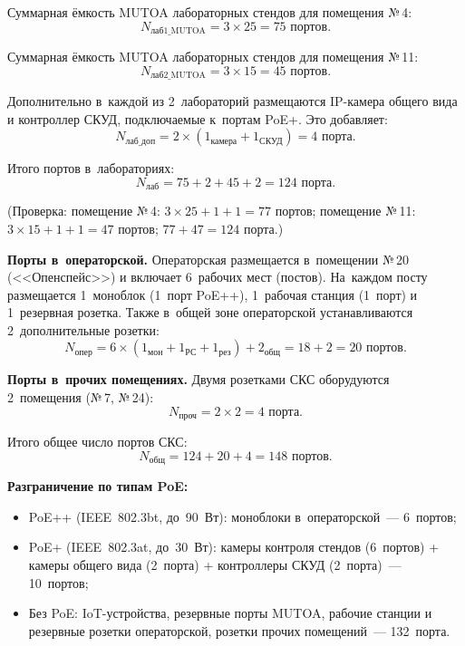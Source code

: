 \documentclass{bmstu}
\begin{document}
Суммарная ёмкость MUTOA лабораторных стендов для помещения №\,4:
\begin{equation}
    N_{\text{лаб1\_MUTOA}} = 3 \times 25 = 75 \text{ портов}.
\end{equation}

Суммарная ёмкость MUTOA лабораторных стендов для помещения №\,11:
\begin{equation}
    N_{\text{лаб2\_MUTOA}} = 3 \times 15 = 45 \text{ портов}.
\end{equation}

Дополнительно в~каждой из 2~лабораторий размещаются IP-камера общего вида и контроллер СКУД, подключаемые к~портам PoE+. Это добавляет:
\begin{equation}
    N_{\text{лаб\_доп}} = 2 \times (1_{\text{камера}} + 1_{\text{СКУД}}) = 4 \text{ порта}.
\end{equation}

Итого портов в~лабораториях:
\begin{equation}
    N_{\text{лаб}} = 75 + 2 + 45 + 2 = 124 \text{ порта}.
\end{equation}

(Проверка: помещение №\,4: $3 \times 25 + 1 + 1 = 77$ портов; помещение №\,11: $3 \times 15 + 1 + 1 = 47$ портов; $77 + 47 = 124$ порта.)

\textbf{Порты в~операторской.} Операторская размещается в~помещении №\,20 (<<Опенспейс>>) и включает 6~рабочих мест (постов). На~каждом посту размещается 1~моноблок (1~порт PoE++), 1~рабочая станция (1~порт) и 1~резервная розетка. Также в~общей зоне операторской устанавливаются 2~дополнительные розетки:
\begin{equation}
    N_{\text{опер}} = 6 \times (1_{\text{мон}} + 1_{\text{РС}} + 1_{\text{рез}}) + 2_{\text{общ}} = 18 + 2 = 20 \text{ портов}.
    \label{eq:n_oper}
\end{equation}

\textbf{Порты в~прочих помещениях.} Двумя розетками СКС оборудуются 2~помещения (№\,7, №\,24):
\begin{equation}
    N_{\text{проч}} = 2 \times 2 = 4 \text{ порта}.
    \label{eq:n_other}
\end{equation}

Итого общее число портов СКС:
\begin{equation}
    N_{\text{общ}} = 124 + 20 + 4 = 148 \text{ портов}.
    \label{eq:n_total_calc}
\end{equation}

\textbf{Разграничение по типам PoE:}
\begin{itemize}
    \item PoE++ (IEEE~802.3bt, до~90~Вт): моноблоки в~операторской~--- 6~портов;
    \item PoE+ (IEEE~802.3at, до~30~Вт): камеры контроля стендов (6~портов) + камеры общего вида (2~порта) + контроллеры СКУД (2~порта)~--- 10~портов;
    \item Без PoE: IoT-устройства, резервные порты MUTOA, рабочие станции и резервные розетки операторской, розетки прочих помещений~--- 132~порта.
\end{itemize}
\end{document}
